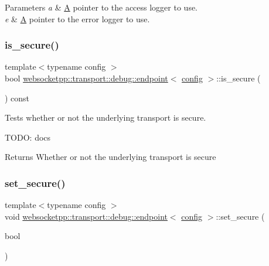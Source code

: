 \begin{DoxyParams}{Parameters}
{\em a} & \mbox{\hyperlink{struct_a}{A}} pointer to the access logger to use. \\
\hline
{\em e} & \mbox{\hyperlink{struct_a}{A}} pointer to the error logger to use. \\
\hline
\end{DoxyParams}
\mbox{\label{classwebsocketpp_1_1transport_1_1debug_1_1endpoint_a5d9e2b3f36fda6cfbc7b2a8c514ccaa2}} 
\subsubsection{\texorpdfstring{is\+\_\+secure()}{is\_secure()}}
{\footnotesize\ttfamily template$<$typename config $>$ \\
bool \mbox{\hyperlink{classwebsocketpp_1_1transport_1_1debug_1_1endpoint}{websocketpp\+::transport\+::debug\+::endpoint}}$<$ \mbox{\hyperlink{classconfig}{config}} $>$\+::is\+\_\+secure (\begin{DoxyParamCaption}{ }\end{DoxyParamCaption}) const\hspace{0.3cm}{\ttfamily [inline]}}



Tests whether or not the underlying transport is secure. 

T\+O\+DO\+: docs

\begin{DoxyReturn}{Returns}
Whether or not the underlying transport is secure 
\end{DoxyReturn}
\mbox{\label{classwebsocketpp_1_1transport_1_1debug_1_1endpoint_aa93a1b98a940de00aadd784b3c058aa6}} 
\subsubsection{\texorpdfstring{set\+\_\+secure()}{set\_secure()}}
{\footnotesize\ttfamily template$<$typename config $>$ \\
void \mbox{\hyperlink{classwebsocketpp_1_1transport_1_1debug_1_1endpoint}{websocketpp\+::transport\+::debug\+::endpoint}}$<$ \mbox{\hyperlink{classconfig}{config}} $>$\+::set\+\_\+secure (\begin{DoxyParamCaption}\item[{bool}]{ }\end{DoxyParamCaption})\hspace{0.3cm}{\ttfamily [inline]}}



